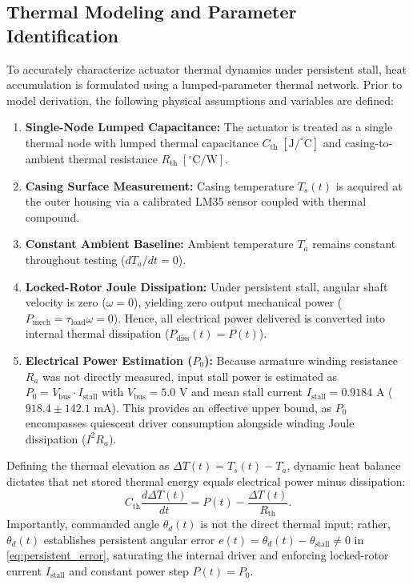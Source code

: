 \documentclass[lettersize,journal]{IEEEtran}
\begin{document}
	\subsection{Thermal Modeling and Parameter Identification}
	\label{sec:thermal_modeling}
	
	To accurately characterize actuator thermal dynamics under persistent stall, heat accumulation is formulated using a lumped-parameter thermal network. Prior to model derivation, the following physical assumptions and variables are defined:
	\begin{enumerate}
		\setlength{\itemsep}{0pt}
		\setlength{\parskip}{0pt}
		\setlength{\parsep}{0pt}
		\item \textbf{Single-Node Lumped Capacitance:} The actuator is treated as a single thermal node with lumped thermal capacitance $C_{\text{th}}\;[\text{J}/^\circ\text{C}]$ and casing-to-ambient thermal resistance $R_{\text{th}}\;[^\circ\text{C}/\text{W}]$.
		\item \textbf{Casing Surface Measurement:} Casing temperature $T_s(t)$ is acquired at the outer housing via a calibrated LM35 sensor coupled with thermal compound.
		\item \textbf{Constant Ambient Baseline:} Ambient temperature $T_a$ remains constant throughout testing ($dT_a/dt = 0$).
		\item \textbf{Locked-Rotor Joule Dissipation:} Under persistent stall, angular shaft velocity is zero ($\omega = 0$), yielding zero output mechanical power ($P_{\text{mech}} = \tau_{\text{load}}\omega = 0$). Hence, all electrical power delivered is converted into internal thermal dissipation ($P_{\text{diss}}(t) = P(t)$).
		\item \textbf{Electrical Power Estimation ($P_0$):} Because armature winding resistance $R_a$ was not directly measured, input stall power is estimated as $P_0 = V_{\text{bus}} \cdot I_{\text{stall}}$ with $V_{\text{bus}} = 5.0\text{ V}$ and mean stall current $I_{\text{stall}} = 0.9184\text{ A}$ ($918.4 \pm 142.1\text{ mA}$). This provides an effective upper bound, as $P_0$ encompasses quiescent driver consumption alongside winding Joule dissipation ($I^2 R_a$).
	\end{enumerate}
	
	Defining the thermal elevation as $\Delta T(t) = T_s(t) - T_a$, dynamic heat balance dictates that net stored thermal energy equals electrical power minus dissipation:
	\begin{equation}
		C_{\text{th}}\frac{d\Delta T(t)}{dt} = P(t) - \frac{\Delta T(t)}{R_{\text{th}}}.
		\label{eq:thermal_ode}
	\end{equation}
	Importantly, commanded angle $\theta_d(t)$ is not the direct thermal input; rather, $\theta_d(t)$ establishes persistent angular error $e(t) = \theta_d(t) - \theta_{\text{stall}} \neq 0$ in \eqref{eq:persistent_error}, saturating the internal driver and enforcing locked-rotor current $I_{\text{stall}}$ and constant power step $P(t) = P_0$.
	
\end{document}
